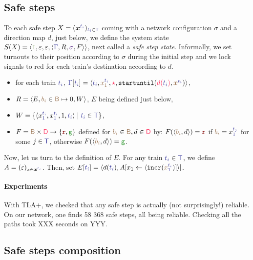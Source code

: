 \documentclass[runningheads]{llncs}
\newcommand{\tuple}[1]{\ensuremath{\langle #1\rangle}}
\newcommand{\directions}{\dirFmt{\mathsf{D}}}
\newcommand{\dirFmt}[1]{{\color{dircolor} #1}}
\newcommand{\dirStop}{\ensuremath{\dirFmt{\star}}\xspace}
\newcommand{\posFmt}[1]{{\color{poscolor}{#1}}}
\newcommand{\blocks}{{\posFmt{\mathsf{B}}}}
\newcommand{\bid}[1]{\ensuremath{\posFmt{b_{#1}}}}
\newcommand{\swFmt}[1]{{\color{swcolor}{#1}}}
\newcommand{\switches}{\ensuremath{\swFmt{\sigma}}}
\newcommand{\trainFmt}[1]{{\color{traincolor} #1}}
\newcommand{\trainTuple}[4]{\langle \trainFmt{#1}, \posFmt{#2}, \dirFmt{#3}, #4 \rangle}
\newcommand{\trainSeq}{\ensuremath{\trainFmt{\Gamma}}\xspace}
\newcommand{\trains}{{\trainFmt{\mathsf{T}}}}
\newcommand{\tid}[1]{\ensuremath{\trainFmt{t_{#1}}}}
\newcommand{\su}[2]{{\mbox{$\mathtt{startuntil}(\dirFmt{#1}, \posFmt{#2})$}}\xspace}
\newcommand{\incr}[1]{{\mbox{\ensuremath{\mathtt{incr}(\posFmt{#1})}}}\xspace}
\newcommand{\regulator}{\ensuremath{R}}
\newcommand{\sigred}{{\mbox{${\color{red!50!black}\mathtt{r}}$}}\xspace}
\newcommand{\siggreen}{{\mbox{${\color{green!50!black}\mathtt{g}}$}}\xspace}
\newcommand{\signals}{\ensuremath{F}}
\newcommand{\stateTuple}[4]{\tuple{#1, #2, #3, #4}}
\newcommand{\guardFmt}[1]{{\color{guardcolor} \ensuremath{\mathtt{#1}}}}
\newcommand{\guardI}{\guardFmt{I}}
\newcommand{\bufferFmt}[1]{#1}
\newcommand{\emptyList}{\ensuremath{\varepsilon}}
\newcommand{\redTuple}[4]{\ensuremath{\tuple{#1, \bufferFmt{#2}, \bufferFmt{#3}, #4}}}
\begin{document}
\subsection{Safe steps}
\label{sec:experiments:4}

To each safe step $X = (\vec{x}^{\tid{i}})_{\tid{i} \in \trains}$ coming with a network configuration $\sigma$ and a direction map $d$, just below, we define the system state $S(X) = \redTuple{\guardI}{ \emptyList}{ \emptyList}{\stateTuple{\trainSeq{}}{\regulator}{\switches}{\signals}}$, next called a \emph{safe step state}. Informally, we set turnouts to their position according to $\sigma$ during the initial step  and we lock signals to red for each train's destination according to $d$. 
\begin{itemize}
\item for each train $\tid{i}$, $\trainSeq[\tid{i}] = \trainTuple{\tid{i}}{x_1^{\tid{i}}}{\dirStop}{\su{d(\tid{i})}{\vec{x}^{\tid{i}}}}$,
\item $R = \langle E,  \bid{i} \in \blocks \mapsto 0, W\rangle$, $E$ being defined just below,
\item $W = \{ \tuple{x_1^\tid{i}, x_1^\tid{i}, 1, \tid{i}}  \mid \tid{i} \in \trains \}$, 
\item $F = \blocks \times \directions \to \{\sigred, \siggreen \}$ defined for $\bid{i} \in \blocks, d \in \directions$ by: $F(\langle \bid{i}, d\rangle) = \sigred$ if  $\bid{i} = x_1^\tid{j}$ for some $j\in \trains$, otherwise $F(\langle \bid{i}, d\rangle)  = \siggreen$. 
\end{itemize}

Now, let us turn to the definition of $E$. For any train $\tid{i} \in \trains$, we define $A= (\emptyList)_{x \in \vec{x}^\tid{i} }$. Then, set  $E[\tid{i}] = \langle d(\tid{i}), A[x_1 \leftarrow \langle \incr{x_1^\tid{i}}] \rangle]$. 

\paragraph{Experiments}  With TLA+, we checked that any safe step is actually (not surprisingly!) reliable.  On our network, one finds 58 368 safe steps, all being reliable. Checking all the paths took XXX seconds on YYY. 

\subsection{Safe steps composition}
\end{document}
